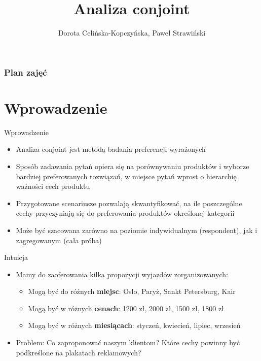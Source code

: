 \documentclass{beamer}
\begin{document}
\begin{frame}
\title[Tytuł]{Analiza conjoint}

\author{Dorota Celińska-Kopczyńska, Paweł Strawiński}

\titlepage
\end{frame}
\begin{frame}[allowframebreaks]
\frametitle{Plan zajęć}
  \tableofcontents
\end{frame}

\section{Wprowadzenie}
\begin{frame}{Wprowadzenie}
  \begin{itemize}
  \item Analiza conjoint jest metodą badania preferencji wyrażonych
  \item Sposób zadawania pytań opiera się na porównywaniu produktów i wyborze bardziej preferowanych rozwiązań, w miejsce pytań wprost o hierarchię ważności cech produktu
  \item Przygotowane scenariusze pozwalają skwantyfikować, na ile poszczególne cechy przyczyniają się do preferowania produktów określonej kategorii
   \item Może być szacowana zarówno na poziomie indywidualnym (respondent), jak i zagregowanym (cała próba)
 \end{itemize}
\end{frame}

\begin{frame}{Intuicja}
  \begin{itemize}
  \item Mamy do zaoferowania kilka propozycji wyjazdów zorganizowanych:
    \begin{itemize}
  \item Mogą być do różnych \textbf{miejsc}: Oslo, Paryż, Sankt Petersburg, Kair
  \item Mogą być w różnych \textbf{cenach}: 1200 zł, 2000 zł, 1500 zł, 1800 zł
  \item Mogą być w różnych \textbf{miesiącach}: styczeń, kwiecień, lipiec, wrzesień
    \end{itemize}
  \item Problem: Co zaproponować naszym klientom? Które cechy powinny być podkreślone na plakatach reklamowych?
    \end{itemize}
\end{frame}
\end{document}
